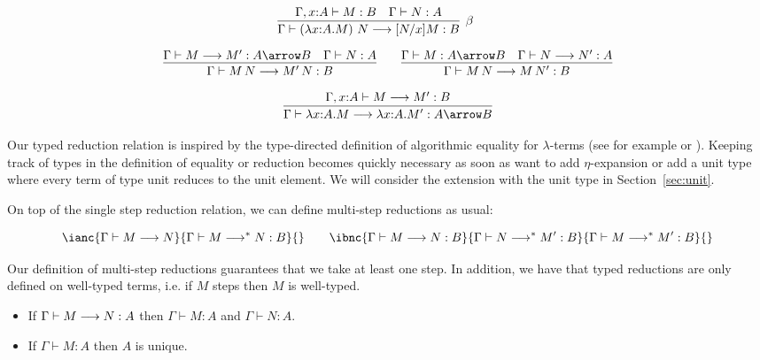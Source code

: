 
\[
\begin{array}{c}
\infer[\beta]
{\Gamma \vdash (\lambda x{:}A.M)~N  \red [N/x]M : B }
    {\Gamma, x{:}A \vdash M :  B & \Gamma \vdash  N : A}
\qquad
\\[1em]
\infer{\Gamma \vdash M\,N \red M'\,N : B}{\Gamma \vdash M \red M' : A \arrow B & \Gamma \vdash N : A}
\qquad
\infer{\Gamma \vdash M\,N \red M\,N' : B}{\Gamma \vdash M : A \arrow B & \Gamma \vdash N \red N' : A}
\\[1em]
\infer{\Gamma \vdash \lambda x{:}A.M \red \lambda x{:}A.M' : A \arrow B}{\Gamma, x{:}A \vdash M \red M' : B}
\end{array}
\]

Our typed reduction relation is inspired by the type-directed
definition of algorithmic equality for $\lambda$-terms (see for
example \cite{Crary:ATAPL} or \cite{Harper03tocl}). Keeping track of
types in the definition of equality or reduction becomes quickly
necessary as soon as want to add $\eta$-expansion or add a unit type
where every term of type unit reduces to the unit element. We will
consider the extension with the unit type in Section~\ref{sec:unit}.


On top of the single step reduction relation, we can define multi-step
reductions as usual:

\[
\ianc{\Gamma \vdash M \red N}{\Gamma \vdash M \mred N : B}{} \qquad
\ibnc{\Gamma \vdash M \red N : B}{\Gamma \vdash N \mred M' : B}
      {\Gamma \vdash M \mred M' : B}{}
\]

Our definition of multi-step reductions guarantees that we take at least one step.
In addition, we have that typed reductions are only defined on well-typed terms, i.e. if $M$ steps then $M$ is well-typed.

\begin{lemma}\quad
  \begin{itemize}
  \item If $\Gamma \vdash M \longrightarrow N : A$ then $\Gamma \vdash M : A$ and $\Gamma \vdash N : A$.
  \item If $\Gamma \vdash M : A$ then $A$ is unique.
  \end{itemize}
\end{lemma}


